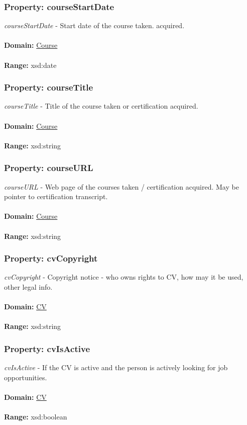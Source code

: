 \documentclass[a4paper,12pt]{article}
\numberwithin{equation}{section}
\begin{document}
\subsubsection{Property: courseStartDate}\hypertarget{courseStartDate}{}
\textit{courseStartDate} - Start date of the course taken. acquired.
\\\\
\textbf{Domain:} \hyperlink{Course}{Course} 
\\\\
\textbf{Range:}  xsd:date

\subsubsection{Property: courseTitle}\hypertarget{courseTitle}{}
\textit{courseTitle} - Title of the course taken or certification acquired.
\\\\
\textbf{Domain:} \hyperlink{Course}{Course} 
\\\\
\textbf{Range:}  xsd:string

\subsubsection{Property: courseURL}\hypertarget{courseURL}{}
\textit{courseURL} - Web page of the courses taken / certification acquired. May be pointer to certification transcript.
\\\\
\textbf{Domain:} \hyperlink{Course}{Course} 
\\\\
\textbf{Range:}  xsd:string

\subsubsection{Property: cvCopyright}\hypertarget{cvCopyright}{}
\textit{cvCopyright} - Copyright notice - who owns rights to CV, how may it be used, other legal info.
\\\\
\textbf{Domain:} \hyperlink{CV}{CV} 
\\\\
\textbf{Range:}  xsd:string

\subsubsection{Property: cvIsActive}\hypertarget{cvIsActive}{}
\textit{cvIsActive} - If the CV is active and the person is actively looking for job opportunities.
\\\\
\textbf{Domain:} \hyperlink{CV}{CV} 
\\\\
\textbf{Range:}  xsd:boolean
\end{document}
